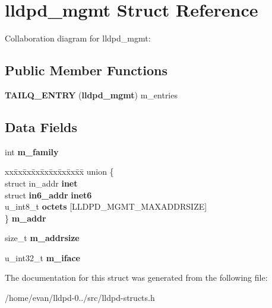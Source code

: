 \section{lldpd\-\_\-mgmt \-Struct \-Reference}
\label{structlldpd__mgmt}


\-Collaboration diagram for lldpd\-\_\-mgmt\-:
\subsection*{\-Public \-Member \-Functions}
\begin{DoxyCompactItemize}
\item 
{\bfseries \-T\-A\-I\-L\-Q\-\_\-\-E\-N\-T\-R\-Y} ({\bf lldpd\-\_\-mgmt}) m\-\_\-entries\label{structlldpd__mgmt_a703a2545cb79c98dd39da6ff903a5496}

\end{DoxyCompactItemize}
\subsection*{\-Data \-Fields}
\begin{DoxyCompactItemize}
\item 
int {\bfseries m\-\_\-family}\label{structlldpd__mgmt_a34ed71464a11b910577cf86bff9f7193}

\item 
\begin{tabbing}
xx\=xx\=xx\=xx\=xx\=xx\=xx\=xx\=xx\=\kill
union \{\\
\>struct in\_addr {\bfseries inet}\\
\>struct {\bf in6\_addr} {\bfseries inet6}\\
\>u\_int8\_t {\bfseries octets} [LLDPD\_MGMT\_MAXADDRSIZE]\\
\} {\bfseries m\_addr}\label{structlldpd__mgmt_a556524b64ec1fd69761ac4582d1ee0c6}
\\

\end{tabbing}\item 
size\-\_\-t {\bfseries m\-\_\-addrsize}\label{structlldpd__mgmt_a934f656502584f072a5fa026886631d4}

\item 
u\-\_\-int32\-\_\-t {\bfseries m\-\_\-iface}\label{structlldpd__mgmt_af867cee8d22e105cd3bf9aadf97a2792}

\end{DoxyCompactItemize}


\-The documentation for this struct was generated from the following file\-:\begin{DoxyCompactItemize}
\item 
/home/evan/lldpd-\/0../src/lldpd-\/structs.\-h\end{DoxyCompactItemize}
